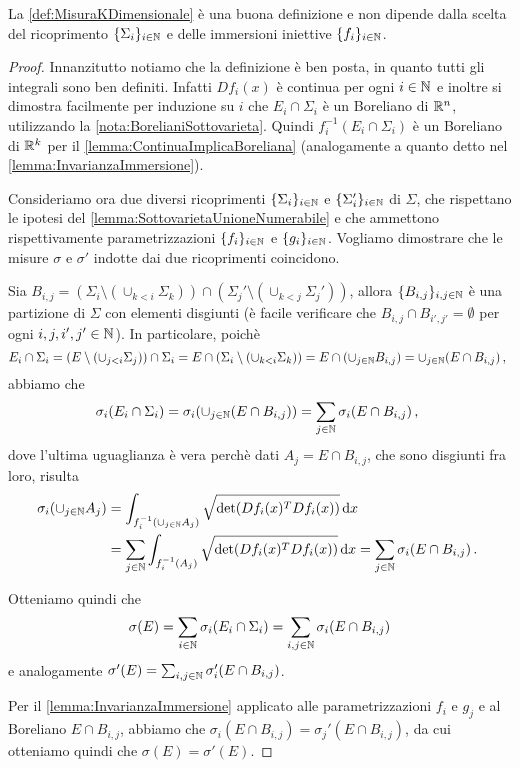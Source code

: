\begin{remark}
	La \cref{def:MisuraKDimensionale} è una buona definizione e non dipende dalla scelta del ricoprimento $\{\Sigma_i\}_{i\in\mathbb N}$ e delle immersioni iniettive $\{f_i\}_{i\in\mathbb N}$.
\end{remark}
\begin{proof}
	Innanzitutto notiamo che la definizione è ben posta, in quanto tutti gli integrali sono ben definiti. Infatti $Df_i(x)$ è continua per ogni $i\in\mathbb N$ e inoltre si dimostra facilmente per induzione su $i$ che $E_i\cap\Sigma_i$ è un Boreliano di $\mathbb R^n$, utilizzando la \cref{nota:BorelianiSottovarieta}. Quindi $f_i^{-1}(E_i\cap\Sigma_i)$ è un Boreliano di $\mathbb R^k$ per il \cref{lemma:ContinuaImplicaBoreliana} (analogamente a quanto detto nel \cref{lemma:InvarianzaImmersione}).

	Consideriamo ora due diversi ricoprimenti $\{\Sigma_i\}_{i\in\mathbb N}$ e $\{\Sigma_i'\}_{i\in\mathbb N}$ di $\Sigma$, che rispettano le ipotesi del \cref{lemma:SottovarietaUnioneNumerabile} e che ammettono rispettivamente parametrizzazioni $\{f_i\}_{i\in\mathbb N}$ e $\{g_i\}_{i\in\mathbb N}$. Vogliamo dimostrare che le misure $\sigma$ e $\sigma'$ indotte dai due ricoprimenti coincidono.
	
	Sia $B_{i,j}=(\Sigma_i\setminus (\cup_{k<i}\Sigma_k))\cap (\Sigma_j'\setminus (\cup_{k<j}\Sigma_j'))$, allora $\{B_{i,j}\}_{i,j\in\mathbb N}$ è una partizione di $\Sigma$ con elementi disgiunti (è facile verificare che $B_{i,j}\cap B_{i',j'}=\emptyset$ per ogni $i,j,i',j'\in\mathbb N$). In particolare, poichè
	\begin{equation*}
		E_i\cap\Sigma_i=(E\setminus (\cup_{j<i}\Sigma_j))\cap \Sigma_i=E\cap (\Sigma_i\setminus (\cup_{k<i}\Sigma_k))=E\cap (\cup_{j\in\mathbb N}B_{i,j})=\cup_{j\in\mathbb N}(E\cap B_{i,j})\, \text{, }
	\end{equation*}
	abbiamo che
	\begin{equation*}
		\sigma_i(E_i\cap \Sigma_i)=\sigma_i(\cup_{j\in\mathbb N}(E\cap B_{i,j}))=\sum_{j\in\mathbb N}\sigma_i(E\cap B_{i,j})\, \text{, }
	\end{equation*}
	dove l'ultima uguaglianza è vera perchè dati $A_j=E\cap B_{i,j}$, che sono disgiunti fra loro, risulta
	\begin{align*}
		\sigma_i(\cup_{j\in\mathbb N}A_j)& =\int_{f_i^{-1}(\cup_{j\in\mathbb N}A_j)}\sqrt{\det(Df_i(x)^TDf_i(x))} \,\mathrm d x\\
		&=\sum_{j\in\mathbb N}\int_{f_i^{-1}(A_j)}\sqrt{\det(Df_i(x)^TDf_i(x))} \,\mathrm d x=\sum_{j\in\mathbb N}\sigma_i(E\cap B_{i,j})\, \text{. }
	\end{align*}
	
	Otteniamo quindi che
	\begin{equation*}
		\sigma(E)=\sum_{i\in\mathbb N}\sigma_i(E_i\cap \Sigma_i)=\sum_{i,j\in\mathbb N} \sigma_i(E\cap B_{i,j})
	\end{equation*}
	e analogamente $\sigma'(E)=\sum_{i,j\in\mathbb N} \sigma_i'(E\cap B_{i,j})$.

	Per il \cref{lemma:InvarianzaImmersione} applicato alle parametrizzazioni $f_i$ e $g_j$ e al Boreliano $E\cap B_{i,j}$, abbiamo che $\sigma_i(E\cap B_{i,j})=\sigma_j'(E\cap B_{i,j})$, da cui otteniamo quindi che $\sigma(E)=\sigma'(E)$.
\end{proof}

